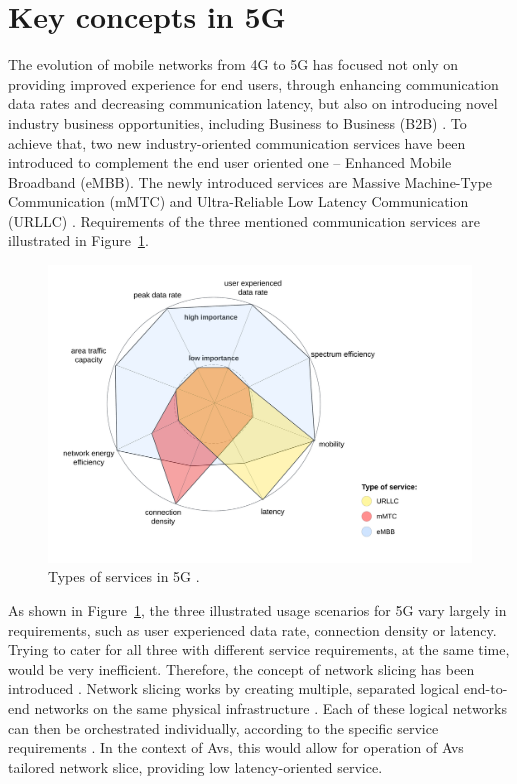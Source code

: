 \documentclass[12pt,a4paper,twoside]{report}
\begin{document}
\section{Key concepts in 5G}
The evolution of mobile networks from 4G to 5G has focused not only on providing improved experience for end users, through enhancing communication data rates and decreasing communication latency, but also on introducing novel industry business opportunities, including Business to Business (B2B) \cite{rommer20195g}. To achieve that, two new industry-oriented communication services have been introduced to complement the end user oriented one – Enhanced Mobile Broadband (eMBB). The newly introduced services are Massive Machine-Type Communication (mMTC) and Ultra-Reliable Low Latency Communication (URLLC) \cite{rommer20195g}. Requirements of the three mentioned communication services are illustrated in Figure~\ref{F:usage-scenarios}. 
\begin{figure}[ht]
	\centering
	\includegraphics[width=\textwidth]{./images/usage-scenarios.png}
	\caption{Types of services in 5G \cite{dahlman-2020-5g}.}
	\label{F:usage-scenarios}
  \end{figure}

As shown in Figure~\ref{F:usage-scenarios}, the three illustrated usage scenarios for 5G vary largely in requirements, such as user experienced data rate, connection density or latency. Trying to cater for all three with different service requirements, at the same time, would be very inefficient. Therefore, the concept of network slicing has been introduced \cite{yousaf2017nfv}. Network slicing works by creating multiple, separated logical end-to-end networks on the same physical infrastructure \cite{yousaf2017nfv}. Each of these logical networks can then be orchestrated individually, according to the specific service requirements \cite{yousaf2017nfv}. In the context of Avs, this would allow for operation of Avs tailored network slice, providing low latency-oriented service.
\end{document}

